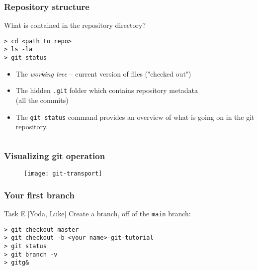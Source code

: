 
\begin{frame}[fragile]

\frametitle{Repository structure}

What is contained in the repository directory?
	
\begin{verbatim}
> cd <path to repo>
> ls -la
> git status
\end{verbatim}
	
\begin{itemize}
	\item The \textit{working tree} -- current version of files ("checked out")
	\item The hidden \texttt{.git} folder which contains repository metadata \\ (all the commits)
	\item The \texttt{git status} command provides an overview of what is going on in the git repository.
\end{itemize}
\begin{verbatim}
\end{verbatim}
	
\end{frame}


\begin{frame}
	\frametitle{Visualizing git operation}
	
	\begin{figure}
		\texttt{[image: git-transport]}
	\end{figure}
\end{frame}



\begin{frame}[fragile]
	\frametitle{Your first branch}
	
	\begin{block}{Task E [Yoda, Luke]}
	Create a branch, off of the \texttt{main} branch:

	\begin{verbatim}
> git checkout master
> git checkout -b <your name>-git-tutorial
> git status
> git branch -v
> gitg&
	\end{verbatim}
	
	\end{block}
	
\end{frame}

